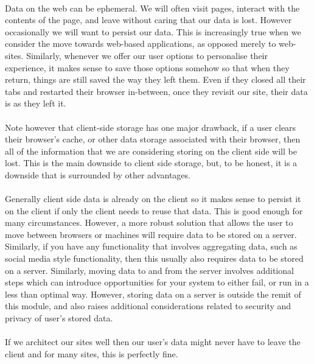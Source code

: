 \paragraph{} Data on the web can be ephemeral. We will often visit pages, interact with the contents of the page, and leave without caring that our data is lost. However occasionally we will want to persist our data. This is increasingly true when we consider the move towards web-based applications, as opposed merely to web-sites. Similarly, whenever we offer our user options to personalise their experience, it makes sense to save those options somehow so that when they return, things are still saved the way they left them. Even if they closed all their tabs and restarted their browser in-between, once they revisit our site, their data is as they left it.
\paragraph{} Note however that client-side storage has one major drawback, if a user clears their browser’s cache, or other data storage associated with their browser, then all of the information that we are considering storing on the client side will be lost. This is the main downside to client side storage, but, to be honest, it is a downside that is surrounded by other advantages.
\paragraph{} Generally client side data is already on the client so it makes sense to persist it on the client if only the client needs to reuse that data. This is good enough for many circumstances. However, a more robust solution that allows the user to move between browsers or machines will require data to be stored on a server. Similarly, if you have any functionality that involves aggregating data, such as social media style functionality, then this usually also requires data to be stored on a server. Similarly, moving data to and from the server involves additional steps which can introduce opportunities for your system to either fail, or run in a less than optimal way. However, storing data on a server is outside the remit of this module, and also raises additional considerations related to security and privacy of user's stored data.
\paragraph{} If we architect our sites well then our user's data might never have to leave the client and for many sites, this is perfectly fine.


